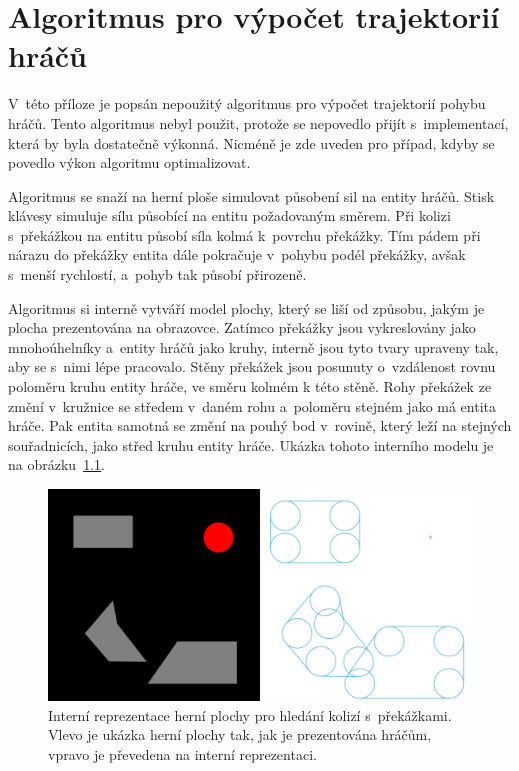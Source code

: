 \chapter{Algoritmus pro výpočet trajektorií hráčů}
\label{app:vypocet-trajektorii-hracu}

V~této příloze je popsán nepoužitý algoritmus pro výpočet trajektorií pohybu hráčů. Tento algoritmus nebyl použit, protože se nepovedlo přijít s~implementací, která by byla dostatečně výkonná. Nicméně je zde uveden pro případ, kdyby se povedlo výkon algoritmu optimalizovat.

Algoritmus se snaží na herní ploše simulovat působení sil na entity hráčů. Stisk klávesy simuluje sílu působící na entitu požadovaným směrem. Při kolizi s~překážkou na entitu působí síla kolmá k~povrchu překážky. Tím pádem při nárazu do překážky entita dále pokračuje v~pohybu podél překážky, avšak s~menší rychlostí, a~pohyb tak působí přirozeně.

Algoritmus si interně vytváří model plochy, který se liší od způsobu, jakým je plocha prezentována na obrazovce. Zatímco překážky jsou vykreslovány jako mnohoúhelníky a~entity hráčů jako kruhy, interně jsou tyto tvary upraveny tak, aby se s~nimi lépe pracovalo. Stěny překážek jsou posunuty o~vzdálenost rovnu poloměru kruhu entity hráče, ve směru kolmém k této stěně. Rohy překážek ze změní v~kružnice se středem v~daném rohu a~poloměru stejném jako má entita hráče. Pak entita samotná se změní na pouhý bod v~rovině, který leží na stejných souřadnicích, jako střed kruhu entity hráče. Ukázka tohoto interního modelu je na obrázku~\ref{fig:stage-logical}.

\begin{figure}[ht]
    \centering
    \includegraphics{doc/obrazky-figures/stage-logical.png}
    \caption{Interní reprezentace herní plochy pro hledání kolizí s~překážkami. Vlevo je ukázka herní plochy tak, jak je prezentována hráčům, vpravo je převedena na interní reprezentaci.}
    \label{fig:stage-logical}
\end{figure}

